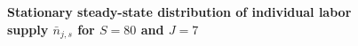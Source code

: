 \documentclass[letterpaper,12pt]{article}
\theoremstyle{definition}
\begin{document}
\begin{spacing}{1.5}
    \begin{figure}[htb]\centering \captionsetup{width=4.0in}
      \caption{\label{FigLabSS}\textbf{Stationary steady-state distribution of individual labor supply $\bar{n}_{j,s}$ for $S=80$ and $J=7$}}
    \end{figure}


\end{spacing}
\end{document}

